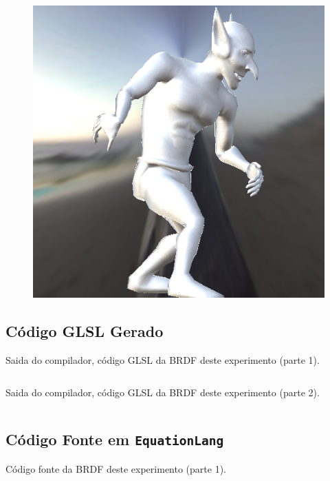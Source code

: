 \begin{figure}[H]
\endminipage\hfill
{}%
  \includegraphics[width=\linewidth]{./Imagens/brdfs/edwards-2006-goblin.png}
\endminipage
\end{figure}

\subsection{Código GLSL Gerado}
\begin{codigo}[H]
    \caption{\small Saida do compilador, código GLSL da BRDF deste experimento (parte 1). }
    \label{cod-edwards-2006-eqlang-declarations}
\begin{lstlisting}[language=C, inputencoding=utf8]
\end{lstlisting}
\end{codigo}

\begin{codigo}[H]
    \caption{\small Saida do compilador, código GLSL da BRDF deste experimento  (parte 2). }
    \label{cod-edwards-2006-eqlang}
\begin{lstlisting}[language=C, inputencoding=utf8]
\end{lstlisting}
\end{codigo}

\subsection{Código Fonte em \texttt{EquationLang}}
\begin{codigo}[H]
    \caption{\small Código fonte da BRDF deste experimento (parte 1).}
    \label{cod-edwards-2006-eqlang}
\begin{lstlisting}[language=tex, frame=none, inputencoding=utf8]
\end{lstlisting}
\end{codigo}
